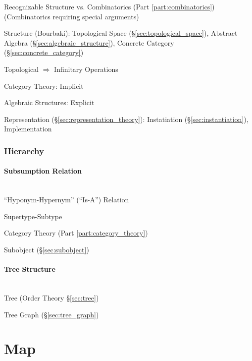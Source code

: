 Recognizable Structure vs. Combinatorics (Part
\ref{part:combinatorics}) (Combinatorics requiring special arguments)

Structure (Bourbaki): Topological Space
(\S\ref{sec:topological_space}), Abstract Algebra
(\S\ref{sec:algebraic_structure}), Concrete Category
(\S\ref{sec:concrete_category})

Topological $\Rightarrow$ Infinitary Operations

Category Theory: Implicit

Algebraic Structures: Explicit

Representation (\S\ref{sec:representation_theory}): Instatiation
(\S\ref{sec:instantiation}), Implementation



\subsubsection{Hierarchy}\label{sec:hierarchy}

\paragraph{Subsumption Relation}\label{sec:subsumption_relation}
\hfill \\

``Hyponym-Hypernym'' (``Is-A'') Relation


Supertype-Subtype

Category Theory (Part \ref{part:category_theory})

Subobject (\S\ref{sec:subobject})



\paragraph{Tree Structure}\label{sec:tree_structure}
\hfill \\

Tree (Order Theory \S\ref{sec:tree})

Tree Graph (\S\ref{sec:tree_graph})



\section{Map}\label{sec:map}

